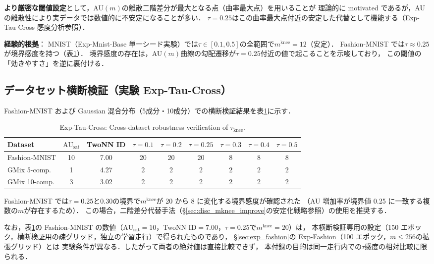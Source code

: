 \documentclass[11pt,a4paper]{jsarticle}
\newcommand{\AUsat}{\mathrm{AU}_{\mathrm{sat}}}
\newcommand{\mknee}{m^{\mathrm{knee}}}
\begin{document}
\textbf{より厳密な閾値設定}として，AU$(m)$の離散二階差分が最大となる点（曲率最大点）を用いることが
理論的に motivated であるが，AU の離散性により実データでは数値的に不安定になることが多い．
$\tau = 0.25$はこの曲率最大点付近の安定した代替として機能する（Exp-Tau-Cross 感度分析参照）．

\textbf{経験的根拠}：
MNIST（Exp-Mnist-Base 単一シード実験）では$\tau \in [0.1, 0.5]$の全範囲で$\mknee = 12$（安定）．
Fashion-MNIST では$\tau \approx 0.25$が境界感度を持つ（表\ref{tab:ez}）．
境界感度の存在は，AU$(m)$曲線の勾配遷移が$\tau = 0.25$付近の値で起こることを示唆しており，
この閾値の「効きやすさ」を逆に裏付ける．

\subsection*{データセット横断検証（実験 Exp-Tau-Cross）}

Fashion-MNIST および Gaussian 混合分布（5成分・10成分）での横断検証結果を表\ref{tab:ez}に示す．

\begin{table}[H]
\centering
\caption{Exp-Tau-Cross: Cross-dataset robustness verification of $\tau_{\mathrm{knee}}$.}
\label{tab:ez}
\small
\begin{tabular}{lcc|cccccc}
\toprule
Dataset & $\AUsat$ & TwoNN ID & $\tau=0.1$ & $\tau=0.2$ & $\tau=0.25$ & $\tau=0.3$ & $\tau=0.4$ & $\tau=0.5$ \\
\midrule
Fashion-MNIST & 10 & 7.00 & 20 & 20 & 20 & 8 & 8 & 8 \\
GMix 5-comp. & 1 & 4.27 & 2 & 2 & 2 & 2 & 2 & 2 \\
GMix 10-comp. & 3 & 3.02 & 2 & 2 & 2 & 2 & 2 & 2 \\
\bottomrule
\end{tabular}
\end{table}

Fashion-MNIST では$\tau = 0.25$と$0.30$の境界で$\mknee$が 20 から 8 に変化する境界感度が確認された
（AU 増加率が境界値 0.25 に一致する複数の$m$が存在するため）．
この場合，二階差分代替手法（§\ref{sec:disc_mknee_improve}の安定化戦略参照）の使用を推奨する．

なお，表\ref{tab:ez}の Fashion-MNIST の数値（$\AUsat = 10$，TwoNN ID$=7.00$，$\tau=0.25$で$\mknee = 20$）は，
本横断検証専用の設定（150 エポック，横断検証用の疎グリッド，独立の学習走行）で得られたものであり，
§\ref{sec:exp_fashion}の Exp-Fashion（100 エポック，$m \leq 256$の拡張グリッド）とは
実験条件が異なる．したがって両者の絶対値は直接比較できず，
本付録の目的は同一走行内での$\tau$感度の相対比較に限られる．
\end{document}
